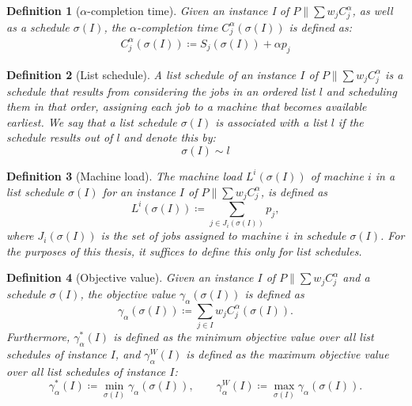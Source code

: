 \documentclass[%
english, titlepage=false %
]{./tum-templates/book/tumbook}
\newtheorem{definition}{Definition}
\begin{document}
\begin{definition}[$\alpha$-completion time]
    Given an instance I of $P \!\parallel\! \sum w_j C_j^{\alpha}$, as well as a schedule $\sigma(I)$, the $\alpha$-completion 
    time $C_j^{\alpha}(\sigma(I))$ is defined as: 
    \begin{align*}
    C_j^{\alpha}(\sigma(I)) \coloneqq S_{j}(\sigma(I)) + \alpha p_j
    \end{align*}
\end{definition}

\begin{definition}[List schedule]
    A list schedule of an instance $I$ of $P \!\parallel\! \sum w_j C_j^{\alpha}$ is a schedule that results from considering the jobs in an ordered list
    $l$ and scheduling them in that order,
    assigning each job to a machine that becomes available earliest.
    We say that a list schedule $\sigma(I)$ is associated with a list $l$ if the schedule results out of $l$ and denote this by: 
    \[
    \sigma(I) \sim l
    \]
\end{definition}


\begin{definition}[Machine load]
The machine load $L^{i}(\sigma(I))$ of machine $i$ in a list schedule $\sigma(I)$ for an instance $I$  of  $P \!\parallel\! \sum w_j C_j^{\alpha}$,
is defined as
\[
    L^{i}(\sigma(I)) \coloneqq \sum_{j \in J_i(\sigma(I))} p_j,
\]
where $J_i(\sigma(I))$ is the set of jobs assigned to machine $i$ in schedule $\sigma(I)$.
For the purposes of this thesis, it suffices to define this only for list schedules. 
\end{definition}


\begin{definition}[Objective value]
Given an instance \(I\) of $P \!\parallel\! \sum w_j C_j^{\alpha}$ and a schedule \(\sigma(I)\), 
the objective value \(\gamma_{\alpha}(\sigma(I))\) is defined as
\[
    \gamma_{\alpha}(\sigma(I))
    \coloneqq
    \sum_{j \in I} w_j C_j^{\alpha}(\sigma(I)).
\]
Furthermore, 
\(\gamma_{\alpha}^{*}(I)\) is defined as the minimum objective value over all list schedules of instance \(I\), and \(\gamma_{\alpha}^{W}(I)\) is defined as the maximum objective value over all list schedules of instance \(I\):
\[
    \gamma_{\alpha}^{*}(I)
    \coloneqq   \min_{\sigma(I)} \gamma_{\alpha}(\sigma(I)), \qquad
    \gamma_{\alpha}^{W}(I)
    \coloneqq   \max_{\sigma(I)} \gamma_{\alpha}(\sigma(I)).
\]  
\end{definition}
\end{document}
